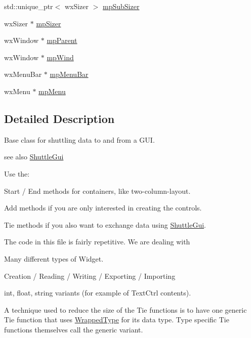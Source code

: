 \begin{DoxyCompactItemize}
\item 
std\+::unique\+\_\+ptr$<$ wx\+Sizer $>$ \hyperlink{class_shuttle_gui_base_aff77a46f8efe09d0faf7f03cf9a97686}{mp\+Sub\+Sizer}
\item 
wx\+Sizer $\ast$ \hyperlink{class_shuttle_gui_base_a8d3582fb89afaea388f2f8daa77adb03}{mp\+Sizer}
\item 
wx\+Window $\ast$ \hyperlink{class_shuttle_gui_base_ac6fe76ac2b65ed2541d7cf3eb4d9f677}{mp\+Parent}
\item 
wx\+Window $\ast$ \hyperlink{class_shuttle_gui_base_af9fd9b06ff97539ce5bbf527c8b9be4f}{mp\+Wind}
\item 
wx\+Menu\+Bar $\ast$ \hyperlink{class_shuttle_gui_base_a13505efc7acfb506da539cb32b6ba7cc}{mp\+Menu\+Bar}
\item 
wx\+Menu $\ast$ \hyperlink{class_shuttle_gui_base_ad3daa563aec7b0437c07161692e98145}{mp\+Menu}
\end{DoxyCompactItemize}


\subsection{Detailed Description}
Base class for shuttling data to and from a G\+UI. 

see also \hyperlink{class_shuttle_gui}{Shuttle\+Gui}

Use the\+:
\begin{DoxyItemize}
\item {\ttfamily Start} / {\ttfamily End} methods for containers, like two-\/column-\/layout.
\item {\ttfamily Add} methods if you are only interested in creating the controls.
\item {\ttfamily Tie} methods if you also want to exchange data using \hyperlink{class_shuttle_gui}{Shuttle\+Gui}.
\end{DoxyItemize}

The code in this file is fairly repetitive. We are dealing with
\begin{DoxyItemize}
\item Many different types of Widget.
\item Creation / Reading / Writing / Exporting / Importing
\item int, float, string variants (for example of Text\+Ctrl contents).
\end{DoxyItemize}

A technique used to reduce the size of the {\ttfamily Tie} functions is to have one generic {\ttfamily Tie} function that uses \hyperlink{class_wrapped_type}{Wrapped\+Type} for its data type. Type specific {\ttfamily Tie} functions themselves call the generic variant.

